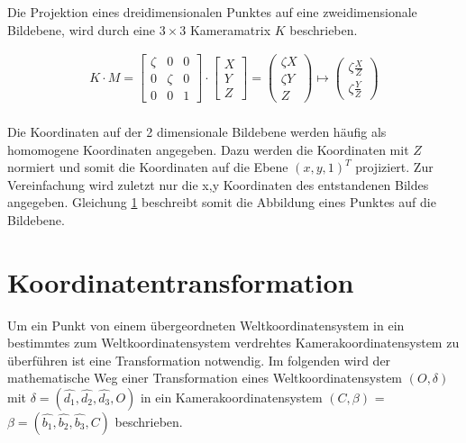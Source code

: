 Die Projektion eines dreidimensionalen Punktes auf eine zweidimensionale Bildebene, wird durch eine $3 \times 3$ Kameramatrix $K$ beschrieben. 

\begin{gather}
	K\cdot M =
	\begin{bmatrix}
		\zeta&0&0\\
		0&\zeta&0\\
		0&0&1
	\end{bmatrix}
	\cdot
	\begin{bmatrix}
		X\\Y\\Z
	\end{bmatrix}
	=
	\begin{pmatrix}
		\zeta X\\ \zeta Y\\ Z
	\end{pmatrix}
	\mapsto
	\begin{pmatrix}
		\zeta \frac{X}{Z}\\ \zeta \frac{Y}{Z}
	\end{pmatrix}
	\label{eq:21}
\end{gather}\\

Die Koordinaten auf der 2 dimensionale Bildebene werden häufig als homomogene Koordinaten angegeben. Dazu werden die Koordinaten mit $Z$ normiert und somit die Koordinaten auf die Ebene $(x,y,1)^T$ projiziert. Zur Vereinfachung wird zuletzt nur die x,y Koordinaten des entstandenen Bildes angegeben. Gleichung \ref{} beschreibt somit die Abbildung eines Punktes auf die Bildebene.

\section{Koordinatentransformation}

Um ein Punkt von einem übergeordneten Weltkoordinatensystem in ein bestimmtes zum Weltkoordinatensystem verdrehtes Kamerakoordinatensystem zu überführen ist eine Transformation notwendig. Im folgenden wird der mathematische Weg einer Transformation eines Weltkoordinatensystem $(O,\delta)$ mit $\delta = (\hat{d_1},\hat{d_2},\hat{d_3},O)$ in ein Kamerakoordinatensystem $(C,\beta)$ = $\beta = (\hat{b_1},\hat{b_2},\hat{b_3},C)$ beschrieben.




